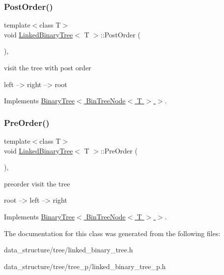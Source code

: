 \mbox{\label{classLinkedBinaryTree_ad8a0144cc092a677eb2b3189059dd19f}} 
\subsubsection{\texorpdfstring{Post\+Order()}{PostOrder()}}
{\footnotesize\ttfamily template$<$class T$>$ \\
void \hyperlink{classLinkedBinaryTree}{Linked\+Binary\+Tree}$<$ T $>$\+::Post\+Order (\begin{DoxyParamCaption}\item[{void($\ast$)(\hyperlink{structBinTreeNode}{Bin\+Tree\+Node}$<$ T $>$ $\ast$)}]{ }\end{DoxyParamCaption})\hspace{0.3cm}{\ttfamily [inline]}, {\ttfamily [virtual]}}

visit the tree with post order \begin{DoxyVerb}left --> right --> root
\end{DoxyVerb}
 

Implements \hyperlink{classBinaryTree_a8bc36fb3d3a12ef13d30cc9b4b84e428}{Binary\+Tree$<$ Bin\+Tree\+Node$<$ T $>$ $>$}.

\mbox{\label{classLinkedBinaryTree_ab6a897c3961294d56cd83790aaa3ff9c}} 
\subsubsection{\texorpdfstring{Pre\+Order()}{PreOrder()}}
{\footnotesize\ttfamily template$<$class T$>$ \\
void \hyperlink{classLinkedBinaryTree}{Linked\+Binary\+Tree}$<$ T $>$\+::Pre\+Order (\begin{DoxyParamCaption}\item[{void($\ast$)(\hyperlink{structBinTreeNode}{Bin\+Tree\+Node}$<$ T $>$ $\ast$)}]{ }\end{DoxyParamCaption})\hspace{0.3cm}{\ttfamily [inline]}, {\ttfamily [virtual]}}

preorder visit the tree \begin{DoxyVerb}root --> left --> right
\end{DoxyVerb}
 

Implements \hyperlink{classBinaryTree_a34fabb6ce2424c3ef1e038e148e273c5}{Binary\+Tree$<$ Bin\+Tree\+Node$<$ T $>$ $>$}.



The documentation for this class was generated from the following files\+:\begin{DoxyCompactItemize}
\item 
data\+\_\+structure/tree/linked\+\_\+binary\+\_\+tree.\+h\item 
data\+\_\+structure/tree/tree\+\_\+p/linked\+\_\+binary\+\_\+tree\+\_\+p.\+h\end{DoxyCompactItemize}
